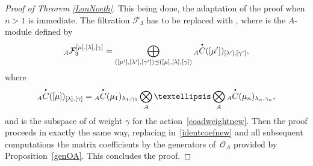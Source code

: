 \documentclass[11pt]{article}
\numberwithin{equation}{section}
\numberwithin{equation}{section}
\theoremstyle{definition}
\newcommand{\Oo}{{\mathcal O}}
\newcommand{\smallbullet}{%
\vcenter{\hbox{\,\scalebox{0.5}{$\bullet$}\,}}
}
\begin{document}
\begin{proof}[Proof of Theorem \ref{LonNoeth}]
This being done, the adaptation of the proof when $n>1$ is immediate. The filtration $\mathcal{F}_3$ has to be replaced with , where  is the $A$-module defined by
\[
{}_A{\mathcal F}_3^{[\mu],[\lambda],[\gamma]}=\bigoplus_{([\mu'],[\lambda'],[\gamma'])\preceq ([\mu],[\lambda],[\gamma])} {}_A \overset{\raisebox{-1.5pt}{\scriptsize$\smallbullet$}}{C} ([\mu'])_{[\lambda'],[\gamma']},
\]
where
\[
{}_A \overset{\raisebox{-1.5pt}{\scriptsize$\smallbullet$}}{C} ([\mu])_{[\lambda],[\gamma]} ={}_A \overset{\raisebox{-1.5pt}{\scriptsize$\smallbullet$}}{C} (\mu_1)_{\lambda_1,\gamma_1}\bigotimes_A \dots \bigotimes_A {}_A \overset{\raisebox{-1.5pt}{\scriptsize$\smallbullet$}}{C} (\mu_n)_{\lambda_n,\gamma_n},
\]
 and \smash{${}_A \overset{\raisebox{-1.5pt}{\scriptsize$\smallbullet$}}{C} (\mu)_{\lambda,\gamma}$} is the subspace of \smash{${}_A \overset{\raisebox{-1.5pt}{\scriptsize$\smallbullet$}}{C} (\mu)_{\lambda}$} of weight $\gamma$ for the action~\eqref{coadweightnew}. Then the proof proceeds in exactly the same way, replacing in~\eqref{identcoefnew} and all subsequent computations the matrix coefficients by the generators of~$\Oo_A$ provided by Proposition~\ref{genOA}. This concludes the proof.
\end{proof}
\end{document}
